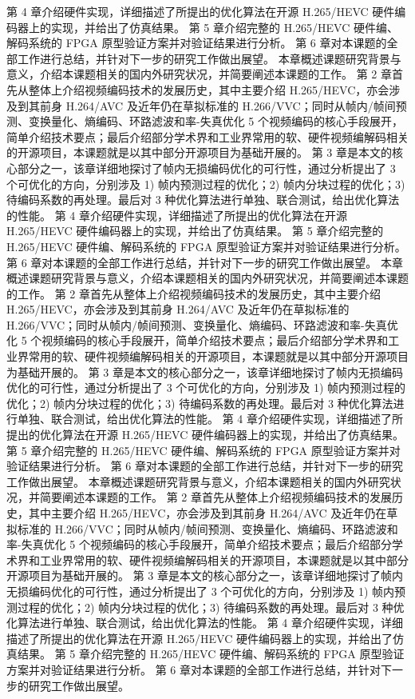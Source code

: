 第 4 章介绍硬件实现，详细描述了所提出的优化算法在开源 H.265/HEVC 硬件编码器上的实现，并给出了仿真结果。
第 5 章介绍完整的 H.265/HEVC 硬件编、解码系统的 FPGA 原型验证方案并对验证结果进行分析。
第 6 章对本课题的全部工作进行总结，并针对下一步的研究工作做出展望。
本章概述课题研究背景与意义，介绍本课题相关的国内外研究状况，并简要阐述本课题的工作。
第 2 章首先从整体上介绍视频编码技术的发展历史，其中主要介绍 H.265/HEVC，亦会涉及到其前身 H.264/AVC 及近年仍在草拟标准的 H.266/VVC；同时从帧内/帧间预测、变换量化、熵编码、环路滤波和率-失真优化 5 个视频编码的核心手段展开，简单介绍技术要点；最后介绍部分学术界和工业界常用的软、硬件视频编解码相关的开源项目，本课题就是以其中部分开源项目为基础开展的。
第 3 章是本文的核心部分之一，该章详细地探讨了帧内无损编码优化的可行性，通过分析提出了 3 个可优化的方向，分别涉及 1) 帧内预测过程的优化；2) 帧内分块过程的优化；3) 待编码系数的再处理。最后对 3 种优化算法进行单独、联合测试，给出优化算法的性能。
第 4 章介绍硬件实现，详细描述了所提出的优化算法在开源 H.265/HEVC 硬件编码器上的实现，并给出了仿真结果。
第 5 章介绍完整的 H.265/HEVC 硬件编、解码系统的 FPGA 原型验证方案并对验证结果进行分析。
第 6 章对本课题的全部工作进行总结，并针对下一步的研究工作做出展望。
本章概述课题研究背景与意义，介绍本课题相关的国内外研究状况，并简要阐述本课题的工作。
第 2 章首先从整体上介绍视频编码技术的发展历史，其中主要介绍 H.265/HEVC，亦会涉及到其前身 H.264/AVC 及近年仍在草拟标准的 H.266/VVC；同时从帧内/帧间预测、变换量化、熵编码、环路滤波和率-失真优化 5 个视频编码的核心手段展开，简单介绍技术要点；最后介绍部分学术界和工业界常用的软、硬件视频编解码相关的开源项目，本课题就是以其中部分开源项目为基础开展的。
第 3 章是本文的核心部分之一，该章详细地探讨了帧内无损编码优化的可行性，通过分析提出了 3 个可优化的方向，分别涉及 1) 帧内预测过程的优化；2) 帧内分块过程的优化；3) 待编码系数的再处理。最后对 3 种优化算法进行单独、联合测试，给出优化算法的性能。
第 4 章介绍硬件实现，详细描述了所提出的优化算法在开源 H.265/HEVC 硬件编码器上的实现，并给出了仿真结果。
第 5 章介绍完整的 H.265/HEVC 硬件编、解码系统的 FPGA 原型验证方案并对验证结果进行分析。
第 6 章对本课题的全部工作进行总结，并针对下一步的研究工作做出展望。
本章概述课题研究背景与意义，介绍本课题相关的国内外研究状况，并简要阐述本课题的工作。
第 2 章首先从整体上介绍视频编码技术的发展历史，其中主要介绍 H.265/HEVC，亦会涉及到其前身 H.264/AVC 及近年仍在草拟标准的 H.266/VVC；同时从帧内/帧间预测、变换量化、熵编码、环路滤波和率-失真优化 5 个视频编码的核心手段展开，简单介绍技术要点；最后介绍部分学术界和工业界常用的软、硬件视频编解码相关的开源项目，本课题就是以其中部分开源项目为基础开展的。
第 3 章是本文的核心部分之一，该章详细地探讨了帧内无损编码优化的可行性，通过分析提出了 3 个可优化的方向，分别涉及 1) 帧内预测过程的优化；2) 帧内分块过程的优化；3) 待编码系数的再处理。最后对 3 种优化算法进行单独、联合测试，给出优化算法的性能。
第 4 章介绍硬件实现，详细描述了所提出的优化算法在开源 H.265/HEVC 硬件编码器上的实现，并给出了仿真结果。
第 5 章介绍完整的 H.265/HEVC 硬件编、解码系统的 FPGA 原型验证方案并对验证结果进行分析。
第 6 章对本课题的全部工作进行总结，并针对下一步的研究工作做出展望。

